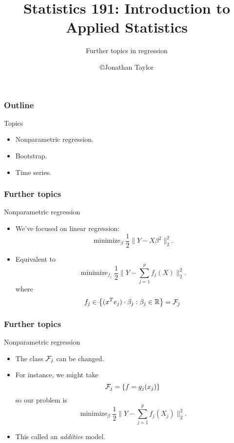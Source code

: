 \documentclass[handout]{beamer}
\title{Statistics 191: Introduction to Applied Statistics}
\subtitle{Further topics in regression}
\author{\copyright Jonathan Taylor \\
   }
\newcommand{\minimize}{\mathop{\mathrm{minimize}}}
\newcommand{\real}{\mathbb{R}}
\begin{document}
   \begin{frame}
   \titlepage
   \end{frame}


   \begin{frame} \frametitle{Outline}

   \begin{block} {Topics}
     \begin{itemize}

     \item Nonparametric regression.
   \item Bootstrap.
     \item Time series.

   \end{itemize}

   \end{block}
   \end{frame}


   \begin{frame} \frametitle{Further topics}

   \begin{block}
   {Nonparametric regression}
       \begin{itemize}
       \item We've focused on  linear regression:
       $$
       \minimize_{\beta} \frac{1}{2} \|Y-X\beta^2\|^2_2.
       $$
       \item Equivalent to
       $$
       \minimize_{f_j} \frac{1}{2} \|Y-\sum_{j=1}^p f_j(X)\|^2_2.
       $$
       where
       $$
       f_j \in \left\{(x^Te_j) \cdot \beta_j: \beta_j \in \real\right\} = {\cal F}_j
       $$
       \end{itemize}
   \end{block}
   \end{frame}


   \begin{frame} \frametitle{Further topics}

   \begin{block}
   {Nonparametric regression}
       \begin{itemize}
       \item The class ${\cal F}_j$ can be changed.
       \item For instance, we might take
       $$
       {\cal F}_j = \left\{f = g_j(x_j) \right\}
       $$
       so our problem is
       $$
       \minimize_{\beta} \frac{1}{2} \|Y-\sum_{j=1}^p f_j(X_j)\|^2_2.
       $$
       \item This called an {\em additive} model.
       \end{itemize}
   \end{block}
   \end{frame}
\end{document}
